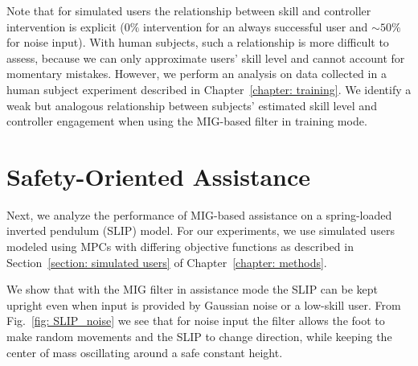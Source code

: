 Note that for simulated users the relationship between skill and controller intervention is explicit ($0\%$ intervention for an always successful user and $\sim50\%$ for noise input). With human subjects, such a relationship is more difficult to assess, because we can only approximate users' skill level and cannot account for momentary mistakes. However, we perform an analysis on data collected in a human subject experiment described in Chapter~\ref{chapter: training}. We identify a weak but analogous relationship between subjects' estimated skill level and controller engagement when using the MIG-based filter in training mode. 


\section{Safety-Oriented Assistance}

Next, we analyze the performance of MIG-based assistance on a spring-loaded inverted pendulum (SLIP) model. For our experiments, we use simulated users modeled using MPCs with differing objective functions as described in Section~\ref{section: simulated users} of Chapter~\ref{chapter: methods}. 

We show that with the MIG filter in assistance mode the SLIP can be kept upright even when input is provided by Gaussian noise or a low-skill user. From Fig.~\ref{fig: SLIP_noise} we see that for noise input the filter allows the foot to make random movements and the SLIP to change direction, while keeping the center of mass oscillating around a safe constant height. 



